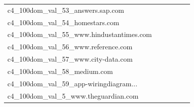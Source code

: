 \documentclass[dvipsnames]{article}
\begin{document}
\begin{appendix}
{\begin{longtable}{m{6cm}m{1.7cm}m{1.7cm}m{1.7cm}m{1.7cm}m{1.7cm}}
	c4\_100dom\_val\_53\_answers.sap.com  & \colorbox[HTML]{fafdcd}{\makebox[\mywidth][c]{23.59}} & \colorbox[HTML]{e6f5ad}{\makebox[\mywidth][c]{23.09}} & \colorbox[HTML]{ffffe5}{\makebox[\mywidth][c]{25.71}} & \colorbox[HTML]{dcf1a5}{\makebox[\mywidth][c]{22.99}} & \colorbox[HTML]{77c578}{\makebox[\mywidth][c]{22.55}}\\
	c4\_100dom\_val\_54\_homestars.com  & \colorbox[HTML]{fefee3}{\makebox[\mywidth][c]{14.13}} & \colorbox[HTML]{e9f6af}{\makebox[\mywidth][c]{13.70}} & \colorbox[HTML]{ffffe5}{\makebox[\mywidth][c]{14.51}} & \colorbox[HTML]{d9f0a3}{\makebox[\mywidth][c]{13.65}} & \colorbox[HTML]{77c578}{\makebox[\mywidth][c]{13.52}}\\
	c4\_100dom\_val\_55\_www.hindustantimes.com  & \colorbox[HTML]{fefee2}{\makebox[\mywidth][c]{12.13}} & \colorbox[HTML]{e5f5ac}{\makebox[\mywidth][c]{11.60}} & \colorbox[HTML]{ffffe5}{\makebox[\mywidth][c]{12.74}} & \colorbox[HTML]{e5f5ac}{\makebox[\mywidth][c]{11.60}} & \colorbox[HTML]{77c578}{\makebox[\mywidth][c]{11.37}}\\
	c4\_100dom\_val\_56\_www.reference.com  & \colorbox[HTML]{ffffe5}{\makebox[\mywidth][c]{11.57}} & \colorbox[HTML]{f8fcbf}{\makebox[\mywidth][c]{11.04}} & \colorbox[HTML]{ffffe5}{\makebox[\mywidth][c]{11.75}} & \colorbox[HTML]{dcf1a5}{\makebox[\mywidth][c]{10.92}} & \colorbox[HTML]{77c578}{\makebox[\mywidth][c]{10.79}}\\
	c4\_100dom\_val\_57\_www.city-data.com  & \colorbox[HTML]{fcfdd5}{\makebox[\mywidth][c]{18.38}} & \colorbox[HTML]{e4f4ab}{\makebox[\mywidth][c]{17.94}} & \colorbox[HTML]{ffffe5}{\makebox[\mywidth][c]{19.61}} & \colorbox[HTML]{addd8e}{\makebox[\mywidth][c]{17.73}} & \colorbox[HTML]{77c578}{\makebox[\mywidth][c]{17.62}}\\
	c4\_100dom\_val\_58\_medium.com  & \colorbox[HTML]{fafdca}{\makebox[\mywidth][c]{15.50}} & \colorbox[HTML]{a9db8c}{\makebox[\mywidth][c]{15.09}} & \colorbox[HTML]{ffffe5}{\makebox[\mywidth][c]{16.58}} & \colorbox[HTML]{cdeb9d}{\makebox[\mywidth][c]{15.18}} & \colorbox[HTML]{77c578}{\makebox[\mywidth][c]{15.01}}\\
	c4\_100dom\_val\_59\_app-wiringdiagram...  & \colorbox[HTML]{ffffe5}{\makebox[\mywidth][c]{9.74}} & \colorbox[HTML]{fbfdd0}{\makebox[\mywidth][c]{9.10}} & \colorbox[HTML]{ffffe5}{\makebox[\mywidth][c]{9.68}} & \colorbox[HTML]{d8efa2}{\makebox[\mywidth][c]{8.88}} & \colorbox[HTML]{77c578}{\makebox[\mywidth][c]{8.75}}\\
	c4\_100dom\_val\_5\_www.theguardian.com  & \colorbox[HTML]{fefee3}{\makebox[\mywidth][c]{14.78}} & \colorbox[HTML]{ddf1a6}{\makebox[\mywidth][c]{14.09}} & \colorbox[HTML]{ffffe5}{\makebox[\mywidth][c]{15.47}} & \colorbox[HTML]{dcf1a5}{\makebox[\mywidth][c]{14.08}} & \colorbox[HTML]{77c578}{\makebox[\mywidth][c]{13.86}}\\

\end{longtable}}
\end{appendix}
\end{document}
